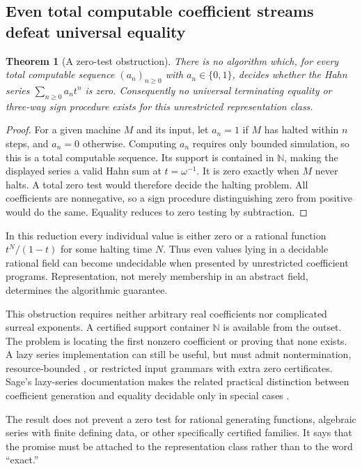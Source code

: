 \documentclass[11pt,letterpaper]{article}
\newtheorem{theorem}{Theorem}[section]
\theoremstyle{definition}
\newcommand{\N}{\mathbb N}
\newcommand{\code}[1]{\texttt{\detokenize{#1}}}
\numberwithin{equation}{section}
\begin{document}
\subsection{Even total computable coefficient streams defeat universal equality}
\begin{theorem}[A zero-test obstruction]\label{thm:halting}
There is no algorithm which, for every total computable sequence $(a_n)_{n\ge0}$ with $a_n\in\{0,1\}$, decides whether the Hahn series $\sum_{n\ge0}a_nt^n$ is zero. Consequently no universal terminating equality or three-way sign procedure exists for this unrestricted representation class.
\end{theorem}
\begin{proof}
For a given machine $M$ and its input, let $a_n=1$ if $M$ has halted within $n$ steps, and $a_n=0$ otherwise. Computing $a_n$ requires only bounded simulation, so this is a total computable sequence. Its support is contained in $\N$, making the displayed series a valid Hahn sum at $t=\omega^{-1}$. It is zero exactly when $M$ never halts. A total zero test would therefore decide the halting problem. All coefficients are nonnegative, so a sign procedure distinguishing zero from positive would do the same. Equality reduces to zero testing by subtraction.
\end{proof}
In this reduction every individual value is either zero or a rational function $t^N/(1-t)$ for some halting time $N$. Thus even values lying in a decidable rational field can become undecidable when presented by unrestricted coefficient programs. Representation, not merely membership in an abstract field, determines the algorithmic guarantee.

This obstruction requires neither arbitrary real coefficients nor complicated surreal exponents. A certified support container $\N$ is available from the outset. The problem is locating the first nonzero coefficient or proving that none exists. A lazy series implementation can still be useful, but must admit nontermination, resource-bounded \code{Unknown}, or restricted input grammars with extra zero certificates. Sage's lazy-series documentation makes the related practical distinction between coefficient generation and equality decidable only in special cases \cite{SageLazy}.

The result does not prevent a zero test for rational generating functions, algebraic series with finite defining data, or other specifically certified families. It says that the promise must be attached to the representation class rather than to the word ``exact.''
\end{document}
